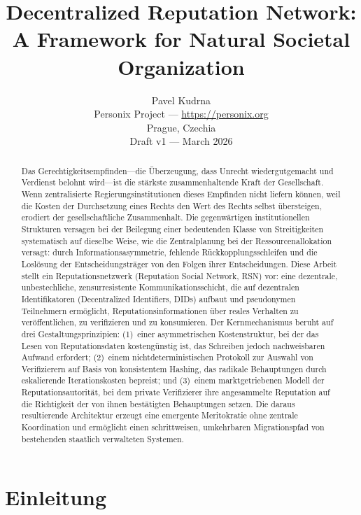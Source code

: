 \documentclass[11pt,a4paper,twocolumn]{article}
\title{\textbf{Decentralized Reputation Network:\\A Framework for Natural Societal Organization}}
\author{Pavel Kudrna\\Personix Project --- \url{https://personix.org}\\Prague, Czechia\\Draft v1 --- March 2026}
\date{}
\begin{document}
\maketitle

\begin{abstract}
Das Gerechtigkeitsempfinden---die Überzeugung, dass Unrecht wiedergutgemacht und Verdienst belohnt wird---ist die stärkste zusammenhaltende Kraft der Gesellschaft. Wenn zentralisierte Regierungsinstitutionen dieses Empfinden nicht liefern können, weil die Kosten der Durchsetzung eines Rechts den Wert des Rechts selbst übersteigen, erodiert der gesellschaftliche Zusammenhalt. Die gegenwärtigen institutionellen Strukturen versagen bei der Beilegung einer bedeutenden Klasse von Streitigkeiten systematisch auf dieselbe Weise, wie die Zentralplanung bei der Ressourcenallokation versagt: durch Informationsasymmetrie, fehlende Rückkopplungsschleifen und die Loslösung der Entscheidungsträger von den Folgen ihrer Entscheidungen. Diese Arbeit stellt ein Reputationsnetzwerk (Reputation Social Network, RSN) vor: eine dezentrale, unbestechliche, zensurresistente Kommunikationsschicht, die auf dezentralen Identifikatoren (Decentralized Identifiers, DIDs) aufbaut und pseudonymen Teilnehmern ermöglicht, Reputationsinformationen über reales Verhalten zu veröffentlichen, zu verifizieren und zu konsumieren. Der Kernmechanismus beruht auf drei Gestaltungsprinzipien: (1)~einer asymmetrischen Kostenstruktur, bei der das Lesen von Reputationsdaten kostengünstig ist, das Schreiben jedoch nachweisbaren Aufwand erfordert; (2)~einem nichtdeterministischen Protokoll zur Auswahl von Verifizierern auf Basis von konsistentem Hashing, das radikale Behauptungen durch eskalierende Iterationskosten bepreist; und (3)~einem marktgetriebenen Modell der Reputationsautorität, bei dem private Verifizierer ihre angesammelte Reputation auf die Richtigkeit der von ihnen bestätigten Behauptungen setzen. Die daraus resultierende Architektur erzeugt eine emergente Meritokratie ohne zentrale Koordination und ermöglicht einen schrittweisen, umkehrbaren Migrationspfad von bestehenden staatlich verwalteten Systemen.
\end{abstract}

\section{Einleitung}
\end{document}
